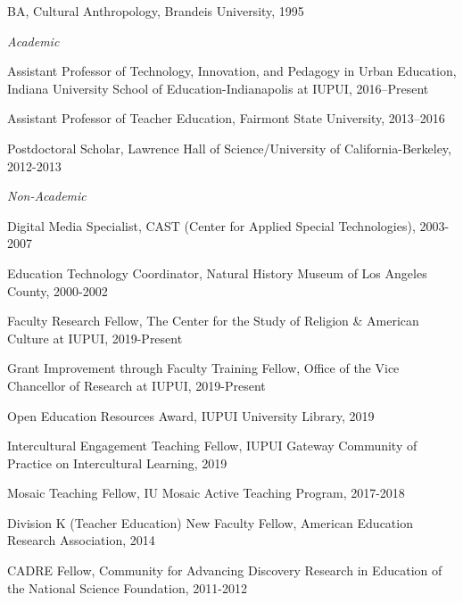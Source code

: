 \documentclass[11pt,article,oneside]{memoir}
\begin{document}
\ind BA, Cultural Anthropology, Brandeis University, 1995

 \bigskip

\medskip
\noindent\emph{Academic \vspace{0.01in}}

\ind Assistant Professor of Technology, Innovation, and Pedagogy in Urban Education,  Indiana University School of Education-Indianapolis at IUPUI, 2016--Present

\ind Assistant Professor of Teacher Education, Fairmont State University, 2013--2016

\ind Postdoctoral Scholar, Lawrence Hall of Science/University of California-Berkeley, 2012-2013

\bigskip

\noindent\emph{Non-Academic \vspace{0.01in}}

\ind Digital Media Specialist, CAST (Center for Applied Special Technologies), 2003-2007

\ind Education Technology Coordinator, Natural History Museum of Los Angeles County, 2000-2002

\bigskip

\medskip

\ind Faculty Research Fellow, The Center for the Study of Religion \& American Culture at IUPUI, 2019-Present

\ind Grant Improvement through Faculty Training Fellow, Office of the Vice Chancellor of Research at IUPUI, 2019-Present

\ind Open Education Resources Award, IUPUI University Library, 2019

\ind Intercultural Engagement Teaching Fellow, IUPUI Gateway Community of Practice on Intercultural Learning, 2019

\ind Mosaic Teaching Fellow, IU Mosaic Active Teaching Program, 2017-2018

\ind Division K (Teacher Education) New Faculty Fellow, American Education Research Association, 2014

\ind CADRE Fellow, Community for Advancing Discovery Research in Education of the National Science Foundation, 2011-2012

\bigskip

\medskip
\end{document}
